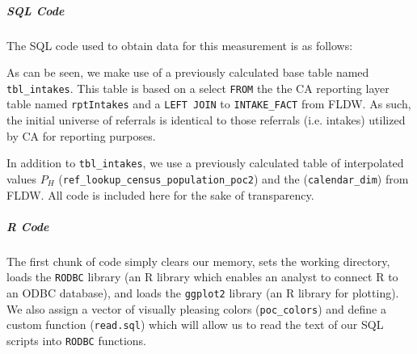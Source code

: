 \documentclass[12pt]{article}\usepackage[]{graphicx}\usepackage[]{color}
\begin{document}
\subparagraph{SQL Code}

The SQL code used to obtain data for this measurement is as follows: 



As can be seen, we make use of a previously calculated base table named \texttt{tbl\_intakes}. This table is based on a select \texttt{FROM} the the CA reporting layer table named \texttt{rptIntakes} and a \texttt{LEFT JOIN} to \texttt{INTAKE\_FACT} from FLDW. As such, the initial universe of referrals is identical to those referrals (i.e. intakes) utilized by CA for reporting purposes.  

In addition to \texttt{tbl\_intakes}, we use a previously calculated table of interpolated values $P_H$ (\texttt{ref\_lookup\_census\_population\_poc2}) and the (\texttt{calendar\_dim}) from FLDW. All code is included here for the sake of transparency. 

\subparagraph{R Code}

The first chunk of code simply clears our memory, sets the working directory, loads the \texttt{RODBC} library (an R library which enables an analyst to connect R to an ODBC database), and loads the \texttt{ggplot2} library (an R library for plotting). We also assign a vector of visually pleasing colors (\texttt{poc\_colors}) and define a custom function (\texttt{read.sql}) which will allow us to read the text of our SQL scripts into \texttt{RODBC} functions. 
\end{document}
